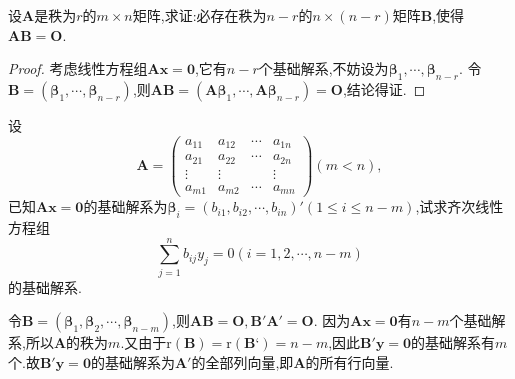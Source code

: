 \documentclass[../../main.tex]{subfiles}%
\begin{document}
\begin{proposition}\label{proposition:线性方程组的解结论1}
设\(\boldsymbol{A}\)是秩为\(r\)的\(m\times n\)矩阵,求证:必存在秩为\(n - r\)的\(n\times(n - r)\)矩阵\(\boldsymbol{B}\),使得\(\boldsymbol{A}\boldsymbol{B}=\boldsymbol{O}\).
\end{proposition}
\begin{proof}

考虑线性方程组\(\boldsymbol{A}\boldsymbol{x}=\boldsymbol{0}\),它有\(n - r\)个基础解系,不妨设为\(\boldsymbol{\beta}_1,\cdots,\boldsymbol{\beta}_{n - r}\). 令\(\boldsymbol{B}=(\boldsymbol{\beta}_1,\cdots,\boldsymbol{\beta}_{n - r})\),则\(\boldsymbol{A}\boldsymbol{B}=(\boldsymbol{A}\boldsymbol{\beta}_1,\cdots,\boldsymbol{A}\boldsymbol{\beta}_{n - r})=\boldsymbol{O}\),结论得证. 

\end{proof}

\begin{example}
设
\[
\boldsymbol{A}=\begin{pmatrix}
a_{11}&a_{12}&\cdots&a_{1n}\\
a_{21}&a_{22}&\cdots&a_{2n}\\
\vdots&\vdots&&\vdots\\
a_{m1}&a_{m2}&\cdots&a_{mn}
\end{pmatrix}(m < n),
\]
已知\(\boldsymbol{A}\boldsymbol{x}=\boldsymbol{0}\)的基础解系为\(\boldsymbol{\beta}_i=(b_{i1},b_{i2},\cdots,b_{in})'(1\leqslant  i\leqslant  n - m)\),试求齐次线性方程组
\[
\sum_{j = 1}^{n}b_{ij}y_j = 0(i = 1,2,\cdots,n - m)
\]
的基础解系.
\end{example}
\begin{solution}

令\(\boldsymbol{B}=(\boldsymbol{\beta}_1,\boldsymbol{\beta}_2,\cdots,\boldsymbol{\beta}_{n - m})\),则\(\boldsymbol{A}\boldsymbol{B}=\boldsymbol{O},\boldsymbol{B}'\boldsymbol{A}'=\boldsymbol{O}\). 因为\(\boldsymbol{A}\boldsymbol{x}=\boldsymbol{0}\)有$n-m$个基础解系,所以\(\boldsymbol{A}\)的秩为\(m\).又由于$\mathrm{r}\left( \boldsymbol{B} \right) =\mathrm{r}\left( \boldsymbol{B}‘ \right) =n-m$,因此\(\boldsymbol{B}'\boldsymbol{y}=\boldsymbol{0}\)的基础解系有$m$个.故\(\boldsymbol{B}'\boldsymbol{y}=\boldsymbol{0}\)的基础解系为\(\boldsymbol{A}'\)的全部列向量,即\(\boldsymbol{A}\)的所有行向量.

\end{solution}
\end{document}
